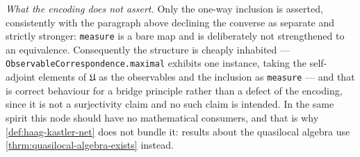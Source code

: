 \begin{definition}
    \emph{What the encoding does not assert.} Only the one-way inclusion is asserted, consistently with the paragraph above declining the converse as separate and strictly stronger: \texttt{measure} is a bare map and is deliberately not strengthened to an equivalence. Consequently the structure is cheaply inhabited --- \texttt{ObservableCorrespondence.maximal} exhibits one instance, taking the self-adjoint elements of $\mathfrak{U}$ as the observables and the inclusion as \texttt{measure} --- and that is correct behaviour for a bridge principle rather than a defect of the encoding, since it is not a surjectivity claim and no such claim is intended. In the same spirit this node should have no mathematical consumers, and that is why \ref{def:haag-kastler-net} does not bundle it: results about the quasilocal algebra use \ref{thrm:quasilocal-algebra-exists} instead.
\end{definition}

